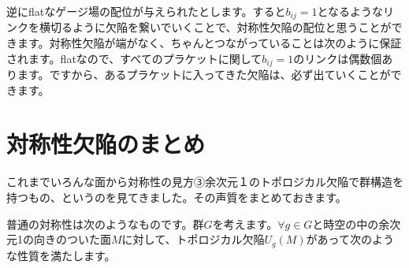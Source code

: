 \documentclass[report,paper=a4, fontsize=12pt, line_length=16cm, number_of_lines=33,dvipdfmx]{jlreq}
\numberwithin{equation}{chapter}
\begin{document}
逆にflatなゲージ場の配位が与えられたとします。すると$b_{ij}=1$となるようなリンクを横切るように欠陥を繋いでいくことで、対称性欠陥の配位と思うことができます。対称性欠陥が端がなく、ちゃんとつながっていることは次のように保証されます。flatなので、すべてのプラケットに関して$b_{ij}=1$のリンクは偶数個あります。ですから、あるプラケットに入ってきた欠陥は、必ず出ていくことができます。

\section{対称性欠陥のまとめ}
これまでいろんな面から対称性の見方③余次元１のトポロジカル欠陥で群構造を持つもの、というのを見てきました。その声質をまとめておきます。

普通の対称性は次のようなものです。群$G$を考えます。$\forall g\in G$と時空の中の余次元1の向きのついた面$M$に対して、トポロジカル欠陥$U_{g}(M)$があって次のような性質を満たします。
\end{document}

